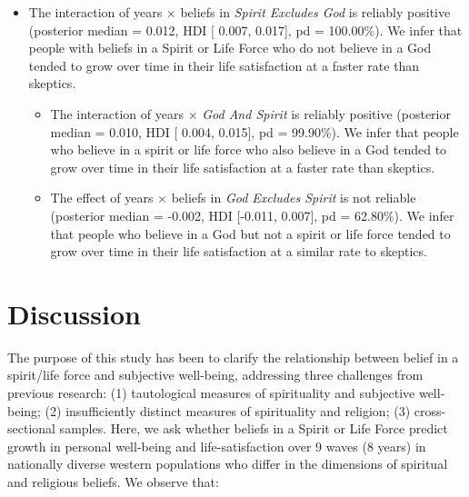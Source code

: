 \documentclass[
  english,
  man,floatsintext]{apa6}
\providecommand{\tightlist}{%
  \setlength{\itemsep}{0pt}\setlength{\parskip}{0pt}}
\begin{document}
\begin{itemize}
\tightlist
\item
  The interaction of years \(\times\) beliefs in \emph{Spirit Excludes God} is reliably positive (posterior median = 0.012, HDI {[} 0.007, 0.017{]}, pd = 100.00\%). We infer that people with beliefs in a Spirit or Life Force who do not believe in a God tended to grow over time in their life satisfaction at a faster rate than skeptics.

  \begin{itemize}
  \tightlist
  \item
    The interaction of years \(\times\) \emph{God And Spirit} is reliably positive (posterior median = 0.010, HDI {[} 0.004, 0.015{]}, pd = 99.90\%). We infer that people who believe in a spirit or life force who also believe in a God tended to grow over time in their life satisfaction at a faster rate than skeptics.
  \item
    The effect of years \(\times\) beliefs in \emph{God Excludes Spirit} is not reliable (posterior median = -0.002, HDI {[}-0.011, 0.007{]}, pd = 62.80\%). We infer that people who believe in a God but not a spirit or life force tended to grow over time in their life satisfaction at a similar rate to skeptics.
  \end{itemize}
\end{itemize}

\hypertarget{discussion}{%
\section{Discussion}\label{discussion}}

The purpose of this study has been to clarify the relationship between belief in a spirit/life force and subjective well-being, addressing three challenges from previous research: (1) tautological measures of spirituality and subjective well-being; (2) insufficiently distinct measures of spirituality and religion; (3) cross-sectional samples. Here, we ask whether beliefs in a Spirit or Life Force predict growth in personal well-being and life-satisfaction over 9 waves (8 years) in nationally diverse western populations who differ in the dimensions of spiritual and religious beliefs. We observe that:
\end{document}
